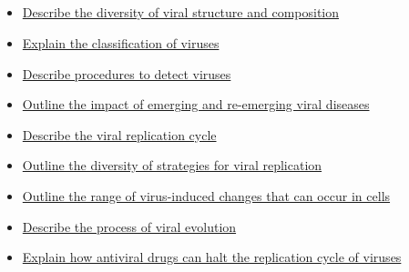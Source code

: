\documentclass[10pt, a4paper]{article}
\newcommand{\MYhref}[3][blue]{\href{#2}{\color{#1}{#3}}}%
\begin{document}
\subsection{\MYhref[melbBlue]{https://notion.so/a4125a77ace94fdd9d1109eb1161d2f5}{Introduction To Viruses}} \begin{itemize} \item \href{https://www.notion.so/cc600dd4cdf648dda0e83d8048712674}{Describe the diversity of viral structure and composition } \item \href{https://www.notion.so/1e8d041eb52a4639ab73240720256df1}{Explain the classification of viruses} \item \href{https://www.notion.so/308d5940136740a78c86fe4da107c56a}{Describe procedures to detect viruses } \item \href{https://www.notion.so/c4588f2a9fe940b698d4b5c7083f8262}{Outline the impact of emerging and re-emerging viral diseases} \item \href{https://www.notion.so/57d4a99af07a4635b3e1ff624d4ce4d9}{Describe the viral replication cycle} \item \href{https://www.notion.so/0227329d90454d20b92d3380dfbf00e8}{Outline the diversity of strategies for viral replication} \item \href{https://www.notion.so/f711c2fbea1a45168d317ff8dc8763d6}{Outline the range of virus-induced changes that can occur in cells} \item \href{https://www.notion.so/b0f5836f4152406ea3fd4a84e287ed19}{Describe the process of viral evolution} \item \href{https://www.notion.so/17410b73286e48e5ab8059aa902376ab}{Explain how antiviral drugs can halt the replication cycle of viruses} \end{itemize}
\end{document}
